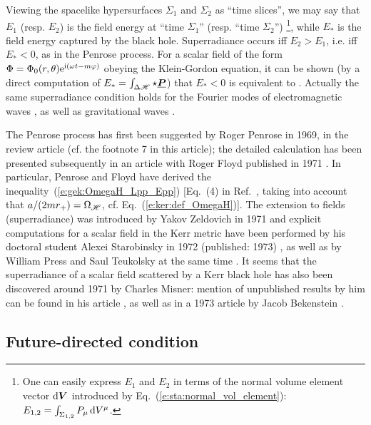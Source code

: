 Viewing the spacelike hypersurfaces $\Sigma_1$ and $\Sigma_2$ as ``time slices'',
we may say that $E_1$ (resp. $E_2$) is the field energy at ``time $\Sigma_1$''
(resp.  ``time $\Sigma_2$'') \footnote{One can easily express $E_1$ and $E_2$ in terms
of the normal volume element vector $\mathrm{d}\bm{V}$ introduced by Eq.~(\ref{e:sta:normal_vol_element}):
$E_{1,2} = \int_{\Sigma_{1,2}} P_\mu \, \mathrm{d} V^\mu$.}, while $E_*$ is the field energy
captured by the black hole.
Superradiance occurs iff $E_2 > E_1$, i.e. iff
$E_* < 0$, as in the Penrose process. For a scalar field of the
form $\Phi = \Phi_0(r,\theta) \mathrm{e}^{\mathrm{i}(\omega t - m \varphi)}$ obeying the Klein-Gordon equation,
it can be shown (by a direct computation of $E_*=\int_{\Delta\mathscr{H}}\star\underline{\bm{P}}$) that $E_*<0$ is equivalent to \cite{Carte79c,Wald84,LasotGATN14}
\be
  .
\ee
Actually the same superradiance condition holds for the Fourier modes of
electromagnetic waves \cite{TeukoP74,Carte79c}, as well as
gravitational waves \cite{TeukoP74}.

\begin{hist} \label{h:gek:Penrose_superradiance}
The Penrose process has first been suggested by Roger Penrose
in 1969,
in the review article \cite{Penro69} (cf. the footnote 7 in this article);
the detailed calculation has been presented subsequently in an
article with Roger Floyd published in 1971 \cite{PenroF71}.
In particular, Penrose and Floyd have derived the inequality~(\ref{e:gek:OmegaH_Lpp_Epp}) [Eq.~(4) in Ref.~\cite{PenroF71}, taking into account that $a/(2mr_+) = \Omega_{\mathscr{H}}$, cf. Eq.~(\ref{e:ker:def_OmegaH})].
The extension to fields (superradiance) was introduced by Yakov Zeldovich
in 1971 \cite{Zeldo71,Zeldo72} and explicit computations for a scalar field in the Kerr metric
have been performed by his doctoral student
Alexei Starobinsky in 1972 (published: 1973) \cite{Staro73}, as well as by
William Press and Saul Teukolsky at the same time \cite{PressT72}.
It seems that the superradiance of a scalar field scattered by a Kerr black hole has also been
discovered around 1971 by Charles Misner: mention of unpublished results
by him can be found in his article \cite{Misne72}, as well as in a 1973 article
by Jacob Bekenstein \cite{Beken73a}.
\end{hist}


\subsection{Future-directed condition}

